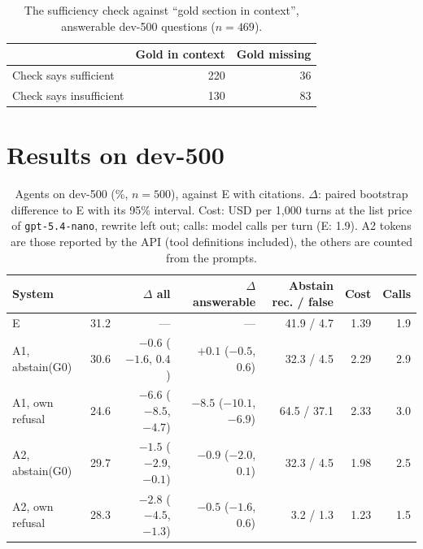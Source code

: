 \begin{table}[ht]
    \centering
    \caption{The sufficiency check against ``gold section in context'', answerable dev-500
    questions ($n = 469$).}
    \label{tab:agents:check}
    \small
    \begin{tabular}{lrr}
        \toprule
        & Gold in context & Gold missing \\
        \midrule
        Check says sufficient   & 220 &  36 \\
        Check says insufficient & 130 &  83 \\
        \bottomrule
    \end{tabular}
\end{table}


\section{Results on dev-500}\label{sec:agents:results}

\begin{table}[ht]
    \centering
    \caption{Agents on dev-500 (\%, $n = 500$), against E with citations. $\Delta$: paired
    bootstrap difference to E with its 95\% interval. Cost: USD per 1{,}000 turns at the list
    price of \texttt{gpt-5.4-nano}, rewrite left out; calls: model calls per turn (E: 1.9). A2 tokens
    are those reported by the API (tool definitions included), the others are counted from the
    prompts.}
    \label{tab:agents:main}
    \small
    \begin{tabular}{lrrrrrr}
        \toprule
        System & \fone{} & $\Delta$ all & $\Delta$ answerable & Abstain rec. / false & Cost & Calls \\
        \midrule
        E                          & 31.2 & ---                     & ---                      & 41.9 / 4.7  & 1.39 & 1.9 \\
        A1, abstain(G0)            & 30.6 & $-0.6$ ($-1.6$, $0.4$)  & $+0.1$ ($-0.5$, $0.6$)   & 32.3 / 4.5  & 2.29 & 2.9 \\
        A1, own refusal            & 24.6 & $-6.6$ ($-8.5$, $-4.7$) & $-8.5$ ($-10.1$, $-6.9$) & 64.5 / 37.1 & 2.33 & 3.0 \\
        A2, abstain(G0)            & 29.7 & $-1.5$ ($-2.9$, $-0.1$) & $-0.9$ ($-2.0$, $0.1$)   & 32.3 / 4.5  & 1.98 & 2.5 \\
        A2, own refusal            & 28.3 & $-2.8$ ($-4.5$, $-1.3$) & $-0.5$ ($-1.6$, $0.6$)   & 3.2 / 1.3   & 1.23 & 1.5 \\
        \bottomrule
    \end{tabular}
\end{table}

